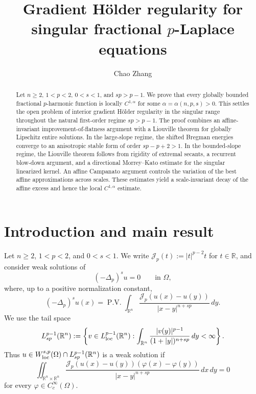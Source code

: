 \documentclass[11pt,reqno]{amsart}
\title[Gradient regularity for singular fractional equations]
{Gradient H\"older regularity for singular fractional
\(p\)-Laplace equations}
\author[C. Zhang]{Chao Zhang}
\numberwithin{equation}{section}
\newcommand{\R}{\mathbb R}
\newcommand{\Jp}{\mathcal J_p}
\newcommand{\dd}{\,d}
\theoremstyle{remark}
\begin{document}
\raggedbottom

\begin{abstract}
Let \(n\ge2\), \(1<p<2\), \(0<s<1\), and \(sp>p-1\).  We prove that
every globally bounded fractional \(p\)-harmonic function is locally
\(C^{1,\alpha}\) for some \(\alpha=\alpha(n,p,s)>0\).  This settles the
open problem of interior gradient H\"older regularity in the singular
range throughout the natural first-order regime \(sp>p-1\).  The proof
combines an affine-invariant improvement-of-flatness argument with a Liouville
theorem for globally Lipschitz entire solutions.  In the large-slope
regime, the shifted Bregman energies converge to an anisotropic stable
form of order \(sp-p+2>1\).  In the bounded-slope regime, the Liouville
theorem follows from rigidity of extremal secants, a recurrent blow-down
argument, and a directional Morrey--Kato estimate for the singular
linearized kernel.  An affine Campanato argument controls the variation
of the best affine approximations across scales.  These estimates yield
a scale-invariant decay of the affine excess and hence the local
\(C^{1,\alpha}\) estimate.
\end{abstract}

\maketitle

\section{Introduction and main result}
\label{sec:introduction}

Let \(n\ge2\), \(1<p<2\), and \(0<s<1\).  We write
\(\Jp(t):=|t|^{p-2}t\) for \(t\in\R\), and consider weak solutions of
\begin{equation}
 (-\Delta_p)^su=0\qquad\text{in }\Omega,
 \label{eq:introduction-equation}
\end{equation}
where, up to a positive normalization constant,
\[
 (-\Delta_p)^su(x)
 =\operatorname{P.V.}\int_{\R^n}
 \frac{\Jp(u(x)-u(y))}
 {|x-y|^{n+sp}}\dd y.
\]
We use the tail space
\[
 L^{p-1}_{sp}(\R^n)
 :=\left\{v\in L^{p-1}_{\rm loc}(\R^n):
 \int_{\R^n}\frac{|v(y)|^{p-1}}
 {(1+|y|)^{n+sp}}\dd y<\infty\right\}.
\]
Thus \(u\in W^{s,p}_{\rm loc}(\Omega)\cap L^{p-1}_{sp}(\R^n)\) is a
weak solution if
\begin{equation*}
 \iint_{\R^n\times\R^n}
 \frac{\Jp(u(x)-u(y))(\varphi(x)-\varphi(y))}
 {|x-y|^{n+sp}}\dd x\!\dd y=0
\end{equation*}
for every \(\varphi\in C_c^\infty(\Omega)\).
\end{document}
